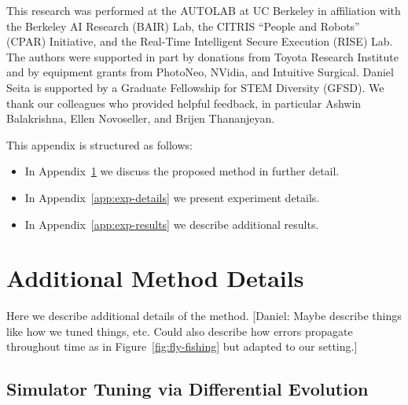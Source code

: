 \documentclass[letterpaper, 10 pt, conference]{ieeeconf}  %
\newcommand{\remark}[3]{{\color{#2}[#1: #3]}}
\newcommand{\daniel}[1]{\remark{Daniel}{blue}{#1}}
\begin{document}
{\small 
This research was performed at the AUTOLAB at UC Berkeley in affiliation with the Berkeley AI Research (BAIR) Lab, the CITRIS ``People and Robots'' (CPAR) Initiative, and the Real-Time Intelligent Secure Execution (RISE) Lab. The authors were supported in part by donations from Toyota Research Institute and by equipment grants from PhotoNeo, NVidia, and Intuitive Surgical. Daniel Seita is supported by a Graduate Fellowship for STEM Diversity (GFSD). We thank our colleagues who provided helpful feedback, in particular Ashwin Balakrishna, Ellen Novoseller, and Brijen Thananjeyan.
}





\normalsize
\cleardoublepage
\appendices


This appendix is structured as follows:

\begin{itemize}
    \item In Appendix~\ref{app:method-details} we discuss the proposed method in further detail.
    \item In Appendix~\ref{app:exp-details} we present experiment details.
    \item In Appendix~\ref{app:exp-results} we describe additional results.
\end{itemize}


\section{Additional Method Details}\label{app:method-details}

Here we describe additional details of the method.
\daniel{Maybe describe things like how we tuned things, etc. Could also describe how errors propagate throughout time as in Figure~\ref{fig:fly-fishing} but adapted to our setting.}

\subsection{Simulator Tuning via Differential Evolution}
\end{document}
